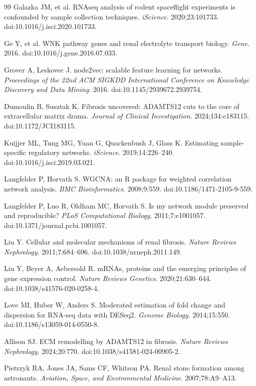 \documentclass[11pt]{article}
\begin{document}
\begin{thebibliography}{99}
 Galazka JM, et al. RNAseq analysis of rodent spaceflight experiments is confounded by sample collection techniques. \emph{iScience}. 2020;23:101733. doi:10.1016/j.isci.2020.101733.

 Ge Y, et al. WNK pathway genes and renal electrolyte transport biology. \emph{Gene}. 2016. doi:10.1016/j.gene.2016.07.033.

 Grover A, Leskovec J. node2vec: scalable feature learning for networks. \emph{Proceedings of the 22nd ACM SIGKDD International Conference on Knowledge Discovery and Data Mining}. 2016. doi:10.1145/2939672.2939754.

 Dumoulin B, Susztak K. Fibrosis uncovered: ADAMTS12 cuts to the core of extracellular matrix drama. \emph{Journal of Clinical Investigation}. 2024;134:e183115. doi:10.1172/JCI183115.

 Kuijjer ML, Tung MG, Yuan G, Quackenbush J, Glass K. Estimating sample-specific regulatory networks. \emph{iScience}. 2019;14:226--240. doi:10.1016/j.isci.2019.03.021.

 Langfelder P, Horvath S. WGCNA: an R package for weighted correlation network analysis. \emph{BMC Bioinformatics}. 2008;9:559. doi:10.1186/1471-2105-9-559.

 Langfelder P, Luo R, Oldham MC, Horvath S. Is my network module preserved and reproducible? \emph{PLoS Computational Biology}. 2011;7:e1001057. doi:10.1371/journal.pcbi.1001057.

 Liu Y. Cellular and molecular mechanisms of renal fibrosis. \emph{Nature Reviews Nephrology}. 2011;7:684--696. doi:10.1038/nrneph.2011.149.

 Liu Y, Beyer A, Aebersold R. mRNAs, proteins and the emerging principles of gene expression control. \emph{Nature Reviews Genetics}. 2020;21:630--644. doi:10.1038/s41576-020-0258-4.

 Love MI, Huber W, Anders S. Moderated estimation of fold change and dispersion for RNA-seq data with DESeq2. \emph{Genome Biology}. 2014;15:550. doi:10.1186/s13059-014-0550-8.

 Allison SJ. ECM remodelling by ADAMTS12 in fibrosis. \emph{Nature Reviews Nephrology}. 2024;20:770. doi:10.1038/s41581-024-00905-2.

 Pietrzyk RA, Jones JA, Sams CF, Whitson PA. Renal stone formation among astronauts. \emph{Aviation, Space, and Environmental Medicine}. 2007;78:A9--A13.


\end{thebibliography}
\end{document}
